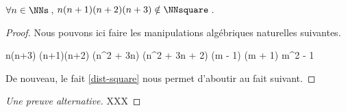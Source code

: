 \begin{fact}
	 $\forall n \in \NNs$\,, $n(n+1)(n+2)(n+3) \notin \NNsquare$\,.
\end{fact}




\begin{proof}
    Nous pouvons ici faire les manipulations algébriques naturelles suivantes.
    
    \medskip
    
    \begin{stepcalc}[style = sar]
    \explnext{}
    	n(n+3) \cdot (n+1)(n+2)
    \explnext{}
    	(n^2 + 3n) \cdot (n^2 + 3n + 2)
    	(m - 1) (m + 1)
    \explnext{}
    	m^2 - 1
    \end{stepcalc}
    
    \medskip
    
    De nouveau, le fait \ref{dist-square} nous permet d'aboutir au fait suivant. 
\end{proof}




\begin{proof}[Une preuve alternative]
    XXX
\end{proof}
